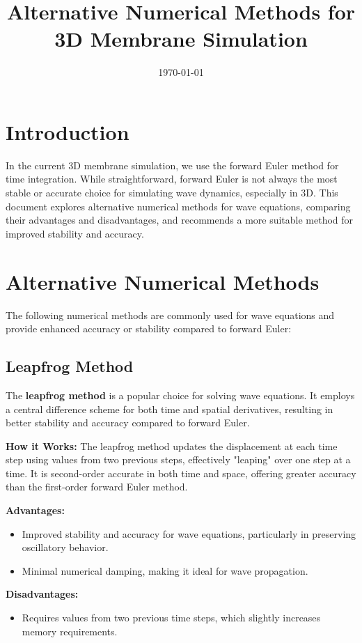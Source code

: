 \documentclass{article}
\title{Alternative Numerical Methods for 3D Membrane Simulation}
\author{}
\date{\today}
\begin{document}
\maketitle

\section{Introduction}

In the current 3D membrane simulation, we use the forward Euler method for time integration. While straightforward, forward Euler is not always the most stable or accurate choice for simulating wave dynamics, especially in 3D. This document explores alternative numerical methods for wave equations, comparing their advantages and disadvantages, and recommends a more suitable method for improved stability and accuracy.

\section{Alternative Numerical Methods}

The following numerical methods are commonly used for wave equations and provide enhanced accuracy or stability compared to forward Euler:

\subsection{Leapfrog Method}

The \textbf{leapfrog method} is a popular choice for solving wave equations. It employs a central difference scheme for both time and spatial derivatives, resulting in better stability and accuracy compared to forward Euler.

\textbf{How it Works:} The leapfrog method updates the displacement at each time step using values from two previous steps, effectively "leaping" over one step at a time. It is second-order accurate in both time and space, offering greater accuracy than the first-order forward Euler method.

\textbf{Advantages:}
\begin{itemize}
    \item Improved stability and accuracy for wave equations, particularly in preserving oscillatory behavior.
    \item Minimal numerical damping, making it ideal for wave propagation.
\end{itemize}

\textbf{Disadvantages:}
\begin{itemize}
    \item Requires values from two previous time steps, which slightly increases memory requirements.
\end{itemize}
\end{document}
